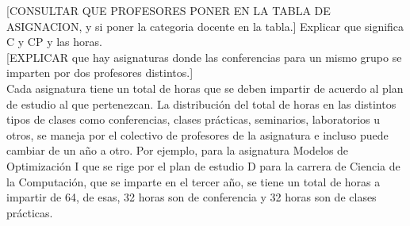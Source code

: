 [CONSULTAR QUE PROFESORES PONER EN LA TABLA DE ASIGNACION, y si poner 
la categoria docente en la tabla.]
Explicar que significa C y CP y las horas. \\


[EXPLICAR que hay asignaturas donde las conferencias para un mismo 
grupo se imparten por dos profesores distintos.] \\

Cada asignatura tiene un total de horas que se deben impartir de acuerdo 
al plan de estudio al que pertenezcan. La distribución del total de horas 
en las distintos tipos de clases como conferencias, clases prácticas, seminarios, 
laboratorios u otros, se maneja por el colectivo de profesores de la asignatura e incluso
puede cambiar de un año a otro. Por ejemplo, para la asignatura Modelos de Optimización I
que se rige por el plan de estudio D para la carrera de Ciencia de la Computación, que 
se imparte en el tercer año, se tiene un total de horas a impartir de 64,
de esas, 32 horas son de conferencia y 32 horas son de clases prácticas.





















